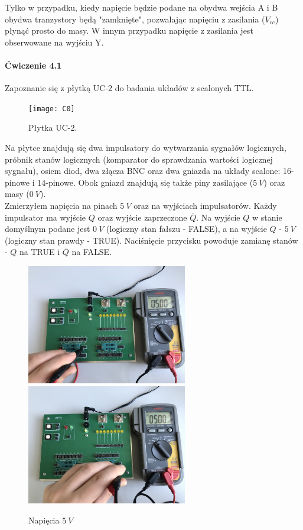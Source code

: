 \documentclass[14pt, table]{extarticle}
\newcommand{\nl}{\vspace{0.5cm}}
\begin{document}
\nl 
Tylko w przypadku, kiedy napięcie będzie podane na obydwa wejścia A i B obydwa tranzystory będą "zamknięte", pozwalając napięciu z zasilania ($V_{cc}$) płynąć prosto do masy. W innym przypadku napięcie z zasilania jest obserwowane na wyjściu Y.

\newpage
\paragraph{Ćwiczenie 4.1 \\}
Zapoznanie się z płytką UC-2 do badania układów z scalonych TTL.

\begin{figure}[H]
\texttt{[image: C0]}
\centering
\captionsetup{labelformat=empty}
\caption{Płytka UC-2.}
\end{figure}

Na płytce znajdują się dwa impulsatory do wytwarzania sygnałów logicznych, próbnik stanów logicznych (komparator do sprawdzania wartości logicznej sygnału), osiem diod, dwa złącza BNC oraz dwa gniazda na układy scalone: 16-pinowe i 14-pinowe. Obok gniazd znajdują się także piny zasilające ($5 \ V$) oraz masy ($0 \ V$). \\

\newpage
Zmierzyłem napięcia na pinach $5 \ V$ oraz na wyjściach impulsatorów. Każdy impulsator ma wyjście $Q$ oraz wyjście zaprzeczone $\overline{Q}$. Na wyjście $Q$ w stanie domyślnym podane jest $0 \ V$ (logiczny stan fałszu - FALSE), a na wyjście $\overline{Q}$ - $5 \ V$ (logiczny stan prawdy - TRUE). Naciśnięcie przycisku powoduje zamianę stanów - $Q$ na TRUE i $\overline{Q}$ na FALSE.

\begin{figure}[H]
\includegraphics[width=7cm]{C62}
\includegraphics[width=7cm]{C63}
\centering
\captionsetup{labelformat=empty}
\caption{Napięcia $5 \ V$}
\end{figure}
\end{document}
